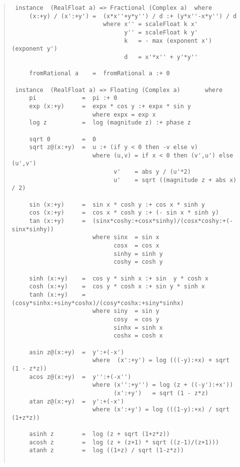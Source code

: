 \begin{quote}
{\begin{verbatim}
 instance  (RealFloat a) => Fractional (Complex a)  where
     (x:+y) / (x':+y') =  (x*x''+y*y'') / d :+ (y*x''-x*y'') / d
                          where x'' = scaleFloat k x'
                                y'' = scaleFloat k y'
                                k   = - max (exponent x') (exponent y')
                                d   = x'*x'' + y'*y''

     fromRational a    =  fromRational a :+ 0
 
 instance  (RealFloat a) => Floating (Complex a)       where
     pi             =  pi :+ 0
     exp (x:+y)     =  expx * cos y :+ expx * sin y
                       where expx = exp x
     log z          =  log (magnitude z) :+ phase z
 
     sqrt 0         =  0
     sqrt z@(x:+y)  =  u :+ (if y < 0 then -v else v)
                       where (u,v) = if x < 0 then (v',u') else (u',v')
                             v'    = abs y / (u'*2)
                             u'    = sqrt ((magnitude z + abs x) / 2)
 
     sin (x:+y)     =  sin x * cosh y :+ cos x * sinh y
     cos (x:+y)     =  cos x * cosh y :+ (- sin x * sinh y)
     tan (x:+y)     =  (sinx*coshy:+cosx*sinhy)/(cosx*coshy:+(-sinx*sinhy))
                       where sinx  = sin x
                             cosx  = cos x
                             sinhy = sinh y
                             coshy = cosh y
 
     sinh (x:+y)    =  cos y * sinh x :+ sin  y * cosh x
     cosh (x:+y)    =  cos y * cosh x :+ sin y * sinh x
     tanh (x:+y)    =  (cosy*sinhx:+siny*coshx)/(cosy*coshx:+siny*sinhx)
                       where siny  = sin y
                             cosy  = cos y
                             sinhx = sinh x
                             coshx = cosh x
 
     asin z@(x:+y)  =  y':+(-x')
                       where  (x':+y') = log (((-y):+x) + sqrt (1 - z*z))
     acos z@(x:+y)  =  y'':+(-x'')
                       where (x'':+y'') = log (z + ((-y'):+x'))
                             (x':+y')   = sqrt (1 - z*z)
     atan z@(x:+y)  =  y':+(-x')
                       where (x':+y') = log (((1-y):+x) / sqrt (1+z*z))
 
     asinh z        =  log (z + sqrt (1+z*z))
     acosh z        =  log (z + (z+1) * sqrt ((z-1)/(z+1)))
     atanh z        =  log ((1+z) / sqrt (1-z*z))
 
\end{verbatim}}
\end{quote}
